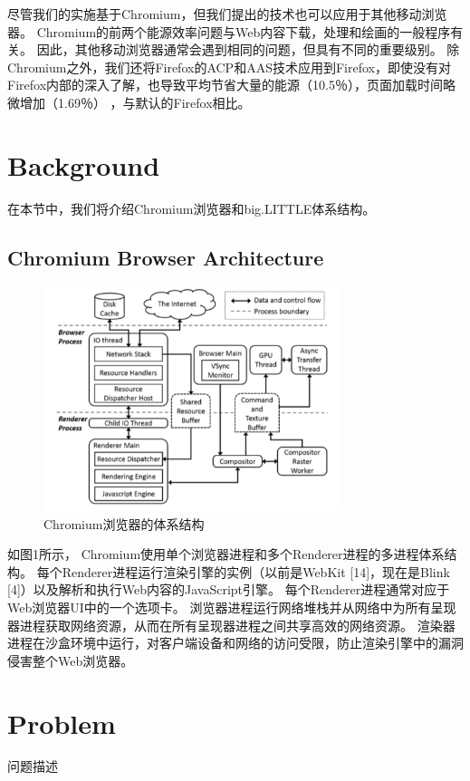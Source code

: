 \documentclass[sigconf]{acmart}
\begin{document}
\begin{CJK}{UTF8}{song}
尽管我们的实施基于Chromium，但我们提出的技术也可以应用于其他移动浏览器。 Chromium的前两个能源效率问题与Web内容下载，处理和绘画的一般程序有关。 因此，其他移动浏览器通常会遇到相同的问题，但具有不同的重要级别。 除Chromium之外，我们还将Firefox的ACP和AAS技术应用到Firefox，即使没有对Firefox内部的深入了解，也导致平均节省大量的能源（10.5％），页面加载时间略微增加（1.69％） ，与默认的Firefox相比。


\section{Background} 

在本节中，我们将介绍Chromium浏览器和big.LITTLE体系结构。

\subsection{Chromium Browser Architecture}

\begin{figure}[htbp]
	\centering
	\includegraphics[width=3.4in]{./figure/figure1}
	\caption{Chromium浏览器的体系结构}\label{fig:tasks}
\end{figure}

如图1所示， Chromium使用单个浏览器进程和多个Renderer进程的多进程体系结构。 每个Renderer进程运行渲染引擎的实例（以前是WebKit [14]，现在是Blink [4]）以及解析和执行Web内容的JavaScript引擎。 每个Renderer进程通常对应于Web浏览器UI中的一个选项卡。 浏览器进程运行网络堆栈并从网络中为所有呈现器进程获取网络资源，从而在所有呈现器进程之间共享高效的网络资源。 渲染器进程在沙盒环境中运行，对客户端设备和网络的访问受限，防止渲染引擎中的漏洞侵害整个Web浏览器。

\section{Problem}
问题描述


\end{CJK}
\end{document}
